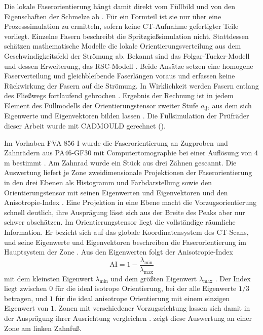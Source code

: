 Die lokale Faserorientierung hängt damit direkt vom Füllbild und von den Eigenschaften der Schmelze ab \cite[S.~282]{Sto18}. Für ein Formteil ist sie nur über eine Prozesssimulation zu ermitteln, sofern keine CT-Aufnahme gefertigter Teile vorliegt. Einzelne Fasern beschreibt die Spritzgießsimulation nicht. Stattdessen schätzen mathematische Modelle die lokale Orientierungsverteilung aus dem Geschwindigkeitsfeld der Strömung ab. Bekannt sind das Folgar-Tucker-Modell und dessen Erweiterung, das RSC-Modell \cite[S.~282]{Sto18}. Beide Ansätze setzen eine homogene Faserverteilung und gleichbleibende Faserlängen voraus und erfassen keine Rückwirkung der Fasern auf die Strömung. In Wirklichkeit werden Fasern entlang des Fließwegs fortlaufend gebrochen \cite[S.~283]{Sto18}. Ergebnis der Rechnung ist in jedem Element des Füllmodells der Orientierungstensor zweiter Stufe $a_{\mathrm{ij}}$, aus dem sich Eigenwerte und Eigenvektoren bilden lassen \cite[S.~282 f.]{Sto18}. Die Füllsimulation der Prüfräder dieser Arbeit wurde mit CADMOULD gerechnet ().


Im Vorhaben FVA 856 I wurde die Faserorientierung an Zugproben und Zahnrädern aus PA46-GF30 mit Computertomographie bei einer Auflösung von $4$\,\textmu m bestimmt \cite[S.~15]{FVA856-I}. Am Zahnrad wurde ein Stück aus drei Zähnen gescannt. Die Auswertung liefert je Zone zweidimensionale Projektionen der Faserorientierung in den drei Ebenen als Histogramm und Farbdarstellung sowie den Orientierungstensor mit seinen Eigenwerten und Eigenvektoren und den Anisotropie-Index \cite[S.~15]{FVA856-I}. Eine Projektion in eine Ebene macht die Vorzugsorientierung schnell deutlich, ihre Ausprägung lässt sich aus der Breite des Peaks aber nur schwer abschätzen. Im Orientierungstensor liegt die vollständige räumliche Information. Er bezieht sich auf das globale Koordinatensystem des CT-Scans, und seine Eigenwerte und Eigenvektoren beschreiben die Faserorientierung im Hauptsystem der Zone \cite[S.~17]{FVA856-I}. Aus den Eigenwerten folgt der Anisotropie-Index
\begin{equation}
    \mathrm{AI} = 1 - \frac{\lambda_{\mathrm{min}}}{\lambda_{\mathrm{max}}}
    \label{eq:anisotropie_index}
\end{equation}
mit dem kleinsten Eigenwert $\lambda_{\mathrm{min}}$ und dem größten Eigenwert $\lambda_{\mathrm{max}}$ \cite[S.~17]{FVA856-I}. Der Index liegt zwischen $0$ für die ideal isotrope Orientierung, bei der alle Eigenwerte $1/3$ betragen, und $1$ für die ideal anisotrope Orientierung mit einem einzigen Eigenwert von $1$. Zonen mit verschiedener Vorzugsrichtung lassen sich damit in der Ausprägung ihrer Ausrichtung vergleichen \cite[S.~17]{FVA856-I}.  zeigt diese Auswertung an einer Zone am linken Zahnfuß.

